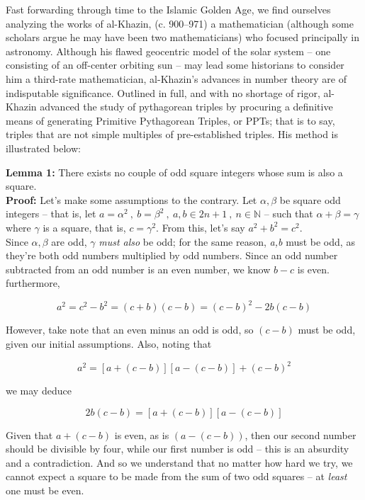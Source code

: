 \documentclass{article}
\begin{document}
Fast forwarding through time to the Islamic Golden Age, we find ourselves analyzing the works of al-Khazin, (c. 900–971) a mathematician  (although some scholars argue he may have been two mathematicians) who focused principally in astronomy. Although his flawed geocentric model of the solar system – one consisting of an off-center orbiting sun – may lead some historians to consider him a third-rate mathematician, al-Khazin’s advances in number theory are of indisputable significance. Outlined in full, and with no shortage of rigor, al-Khazin advanced the study of pythagorean triples by procuring a definitive means of generating Primitive Pythagorean Triples, or PPTs; that is to say, triples that are not simple multiples of pre-established triples. His method is illustrated below:\\

\newpage

\textbf{Lemma 1:} There exists no couple of odd square integers whose sum is also a square. \\

\textbf{Proof:} Let's make some assumptions to the contrary. Let $\alpha, \beta$ be square odd integers -- that is, let $a = \alpha ^2 \ , \ b = \beta^2 \ , \ a,b \in 2n+1 \ , \ n \in \mathbb{N} $ -- such that $\alpha + \beta = \gamma $ where $\gamma$ is a square, that is, $c = \gamma^2 $. From this, let's say $a^2 + b^2 = c^2$.\\

Since $\alpha, \beta$ are odd, $\gamma$ \textit{must also} be odd; for the same reason, \textit{a,b} must be odd, as they're both odd numbers multiplied by odd numbers. Since an odd number subtracted from an odd number is an even number, we know $b-c$ is even. furthermore, 

$$ a^2 = c^2 - b^2 = (c+b)(c-b) = (c-b)^2 - 2b(c-b) $$

However, take note that an even minus an odd is odd, so $(c-b)$ must be odd, given our initial assumptions. Also, noting that

$$ a^2 = [a+(c-b)][a-(c-b)]+(c-b)^2 $$

we may deduce

$$ 2b( c-b ) = [ a + (c-b) ][a - (c-b)] $$ 

Given that $a+(c-b)$ is even, as is $(a-(c-b))$, then our second number should be divisible by four, while our first number is odd -- this is an absurdity and a contradiction. And so we understand that no matter how hard we try, we cannot expect a square to be made from the sum of two odd squares -- at \textit{least} one must be even. \\
\end{document}
